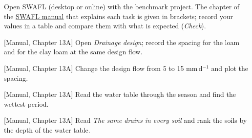 {\small Open SWAFL (desktop or online) with the benchmark project. The chapter of the \href{https://github.com/halilunaziru73-creator/Coupled-Water-Fluxes-Pore-Scale-Dynamics-Precision-Irrigation-Mulching-Feedback-Loops/raw/main/Software/v1.1.0/SWAFL_Desktop/docs/manual_v1.1.0/SWAFL_Manual_v1.1.0.pdf}{SWAFL manual} that explains each task is given in brackets; record your values in a table and compare them with what is expected (\emph{Check}).}\par\vspace{3pt}
\begin{exlist}
\item {\color{khblue}[Manual, Chapter 13A]} Open \emph{Drainage design}; record the spacing for the loam and for the clay loam at the same design flow.\par{}
\item {\color{khblue}[Manual, Chapter 13A]} Change the design flow from 5 to 15 mm\,d$^{-1}$ and plot the spacing.\par{}
\item {\color{khblue}[Manual, Chapter 13A]} Read the water table through the season and find the wettest period.\par{}
\item {\color{khblue}[Manual, Chapter 13A]} Read \emph{The same drains in every soil} and rank the soils by the depth of the water table.\par{}
\end{exlist}
